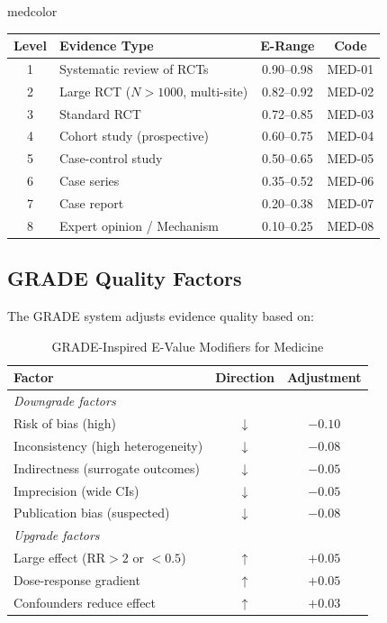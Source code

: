 \documentclass[11pt,a4paper]{article}
\theoremstyle{remark}
\begin{document}
\begin{disciplinebox}{medcolor}
\begin{center}
\begin{tabular}{clcc}
\toprule
\textbf{Level} & \textbf{Evidence Type} & \textbf{E-Range} & \textbf{Code} \\
\midrule
1 & Systematic review of RCTs & 0.90--0.98 & MED-01 \\
2 & Large RCT ($N > 1000$, multi-site) & 0.82--0.92 & MED-02 \\
3 & Standard RCT & 0.72--0.85 & MED-03 \\
4 & Cohort study (prospective) & 0.60--0.75 & MED-04 \\
5 & Case-control study & 0.50--0.65 & MED-05 \\
6 & Case series & 0.35--0.52 & MED-06 \\
7 & Case report & 0.20--0.38 & MED-07 \\
8 & Expert opinion / Mechanism & 0.10--0.25 & MED-08 \\
\bottomrule
\end{tabular}
\end{center}
\end{disciplinebox}

\subsection{GRADE Quality Factors}

The GRADE system adjusts evidence quality based on:

\begin{table}[h]
\centering
\caption{GRADE-Inspired E-Value Modifiers for Medicine}
\label{tab:grade-modifiers}
\begin{tabular}{lcc}
\toprule
\textbf{Factor} & \textbf{Direction} & \textbf{Adjustment} \\
\midrule
\multicolumn{3}{l}{\textit{Downgrade factors}} \\
Risk of bias (high) & $\downarrow$ & $-0.10$ \\
Inconsistency (high heterogeneity) & $\downarrow$ & $-0.08$ \\
Indirectness (surrogate outcomes) & $\downarrow$ & $-0.05$ \\
Imprecision (wide CIs) & $\downarrow$ & $-0.05$ \\
Publication bias (suspected) & $\downarrow$ & $-0.08$ \\
\midrule
\multicolumn{3}{l}{\textit{Upgrade factors}} \\
Large effect ($\text{RR} > 2$ or $< 0.5$) & $\uparrow$ & $+0.05$ \\
Dose-response gradient & $\uparrow$ & $+0.05$ \\
Confounders reduce effect & $\uparrow$ & $+0.03$ \\
\bottomrule
\end{tabular}
\end{table}
\end{document}
